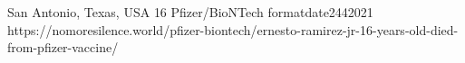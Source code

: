           {
            San Antonio, Texas, USA
          }
          {
            16
          }
          {
            Pfizer/BioNTech
          }
          {
          }
          {
             formatdate{24}{4}{2021}
          }
          {
            https://nomoresilence.world/pfizer-biontech/ernesto-ramirez-jr-16-years-old-died-from-pfizer-vaccine/
          }

